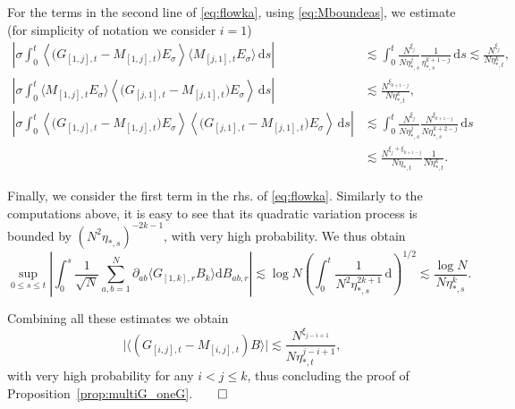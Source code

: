\documentclass[10pt]{amsart}
\numberwithin{equation}{section}
\newcommand{\dif}{\mathrm{d}}
\begin{document}
For the terms in the second line of \eqref{eq:flowka}, using \eqref{eq:Mboundeas}, we estimate (for simplicity of notation we consider $i=1$)
\begin{equation}
\begin{split}
\left|\sigma\int_0^t\left\langle \big(G_{[1,j],t}-M_{[1,j],t}\big)E_\sigma\right\rangle\langle M_{[j,1],t} E_\sigma\rangle\,\dif s\right|&\lesssim \int_0^t \frac{N^{\xi_j}}{N\eta_{*,s}^j} \frac{1}{\eta_{*,s}^{k+1-j}}\,\dif s\lesssim \frac{N^{\xi_j}}{N\eta_{*,t}^k}, \\
\left|\sigma\int_0^t\langle M_{[1,j],t}E_\sigma\rangle\left\langle \big(G_{[j,1],t}-M_{[j,1],t}\big) E_\sigma\right\rangle\,\dif s\right|&\lesssim \frac{N^{\xi_{k+1-j}}}{N\eta_{*,t}^k},\\
\left|\sigma\int_0^t\left\langle \big(G_{[1,j],t}-M_{[1,j],t}\big)E_\sigma\right\rangle \left\langle \big(G_{[j,1],t}-M_{[j,1],t}\big) E_\sigma\right\rangle\,\dif s\right|&\lesssim \int_0^t \frac{N^{\xi_j}}{N\eta_{*,s}^j} \frac{N^{\xi_{k+1-j}}}{N\eta_{*,s}^{k+2-j}}\,\dif s\\
&\lesssim \frac{N^{\xi_j+\xi_{k+1-j}}}{N\eta_{*,t}} \frac{1}{N\eta_{*,t}^k}.
\end{split}
\end{equation}

Finally, we consider the first term in the rhs. of \eqref{eq:flowka}. Similarly to the computations above, it is easy to see that its quadratic variation process is bounded by $(N^2\eta_{*,s})^{-2k-1}$, with very high probability. We thus obtain
\begin{equation}
\sup_{0\le s\le t}\left|\int_0^s \frac{1}{\sqrt{N}}\sum_{a,b=1}^N \partial_{ab}  \langle G_{[1,k],r}B_k\rangle\dif B_{ab,r}\right|\lesssim \log N\left(\int_0^t \frac{1}{N^2\eta_{*,s}^{2k+1}}\,\dif \right)^{1/2}\lesssim  \frac{\log N}{N\eta_{*,s}^k}.
\end{equation}

Combining all these estimates  we obtain
\begin{equation}
\big|\langle (G_{[i,j],t}-M_{{[i,j]},t})B\rangle\big|\lesssim\frac{N^{\xi_{j-i+1}}}{N\eta_{*,t}^{j-i+1}},
\end{equation}
with very high probability for any $i<j\le k$, thus concluding the proof of Proposition~\ref{prop:multiG_oneG}.\hfill$\qed$
\end{document}
